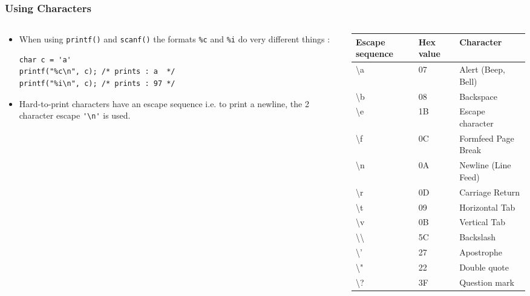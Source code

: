 

\begin{frame}[fragile]
\frametitle{Using Characters}
\begin{columns}

\begin{column}{0.45\textwidth}
\begin{itemize}[<+->]
\item When using \verb^printf()^ and \verb^scanf()^ the formats
\verb^%c^ and \verb^%i^ do very different things :
\begin{verbatim}
char c = 'a'
printf("%c\n", c); /* prints : a  */
printf("%i\n", c); /* prints : 97 */
\end{verbatim}
\item Hard-to-print characters have an escape sequence
i.e. to print a newline, the 2 character escape \verb^'\n'^ is used.
\end{itemize}
\end{column}

\begin{column}{0.55\textwidth}
{\small
\begin{tabular}{|l|l|l|}\hline
Escape sequence	& Hex value & Character \\ \hline
\textbackslash a & 07 & Alert (Beep, Bell)\\
\textbackslash b &08&Backspace\\
\textbackslash e &1B&Escape character\\
\textbackslash f &0C&Formfeed Page Break\\
\textbackslash n &0A&Newline (Line Feed)\\
\textbackslash r &0D&Carriage Return\\
\textbackslash t &09&Horizontal Tab\\
\textbackslash v &0B&Vertical Tab\\
\textbackslash\textbackslash &5C&Backslash\\
\textbackslash ' &27&Apostrophe \\
\textbackslash " &22&Double quote \\
\textbackslash ? &3F&Question mark \\ \hline
\end{tabular}
}
\end{column}

\end{columns}
\end{frame}




